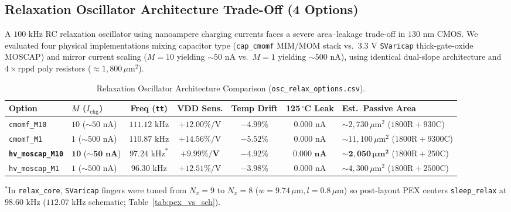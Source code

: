 \documentclass[10pt,a4paper]{article}
\begin{document}
\subsection{Relaxation Oscillator Architecture Trade-Off (4 Options)}
A $100\text{ kHz}$ RC relaxation oscillator using nanoampere charging currents faces a severe area--leakage trade-off in $130\text{ nm}$ CMOS. We evaluated four physical implementations mixing capacitor type (\texttt{cap\_cmomf} MIM/MOM stack vs.\ $3.3\text{ V}$ \texttt{SVaricap} thick-gate-oxide MOSCAP) and mirror current scaling ($M=10$ yielding $\sim 50\text{ nA}$ vs.\ $M=1$ yielding $\sim 500\text{ nA}$), using identical dual-slope architecture and $4\times\text{rppd}$ poly resistors ($\approx 1{,}800\,\mu\text{m}^2$).

\begin{table}[H]
\centering
\caption{Relaxation Oscillator Architecture Comparison (\texttt{osc\_relax\_options.csv}).}
\label{tab:relax_tradeoff}
\footnotesize
\setlength{\tabcolsep}{4pt}
\begin{tabularx}{\textwidth}{@{}llcccc >{\raggedright\arraybackslash}X@{}}
\toprule
\textbf{Option} & \textbf{$M$ ($I_{\text{chg}}$)} & \textbf{Freq (\texttt{tt})} & \textbf{VDD Sens.} & \textbf{Temp Drift} & \textbf{125\,$^\circ$C Leak} & \textbf{Est.\ Passive Area} \\
\midrule
\texttt{cmomf\_M10} & $10$ ($\sim 50\text{ nA}$) & $111.12\text{ kHz}$ & $+12.00\%/\text{V}$ & $-4.99\%$ & $0.000\text{ nA}$ & $\sim 2{,}730\,\mu\text{m}^2$ ($1800\text{R}+930\text{C}$) \\
\texttt{cmomf\_M1} & $1$ ($\sim 500\text{ nA}$) & $110.87\text{ kHz}$ & $+14.56\%/\text{V}$ & $-5.52\%$ & $0.000\text{ nA}$ & $\sim 11{,}100\,\mu\text{m}^2$ ($1800\text{R}+9300\text{C}$) \\
\rowcolor{PassBg} \textbf{\texttt{hv\_moscap\_M10}} & $\mathbf{10}$ ($\mathbf{\sim 50\text{ nA}}$) & $\mathbf{97.24}\text{ kHz}^*$ & $\mathbf{+9.99\%/\text{V}}$ & $\mathbf{-4.92\%}$ & $\mathbf{0.000\text{ nA}}$ & $\mathbf{\sim 2{,}050\,\mu\text{m}^2}$ ($1800\text{R}+250\text{C}$) \\
\texttt{hv\_moscap\_M1} & $1$ ($\sim 500\text{ nA}$) & $96.30\text{ kHz}$ & $+12.51\%/\text{V}$ & $-3.98\%$ & $0.000\text{ nA}$ & $\sim 4{,}300\,\mu\text{m}^2$ ($1800\text{R}+2500\text{C}$) \\
\bottomrule
\end{tabularx}
\begin{flushleft}\footnotesize $^*$In \texttt{relax\_core}, \texttt{SVaricap} fingers were tuned from $N_x=9$ to $N_x=8$ ($w=9.74\,\mu\text{m}, l=0.8\,\mu\text{m}$) so post-layout PEX centers \texttt{sleep\_relax} at $98.60\text{ kHz}$ ($112.07\text{ kHz}$ schematic; Table~\ref{tab:pex_vs_sch}).\end{flushleft}
\end{table}
\end{document}

